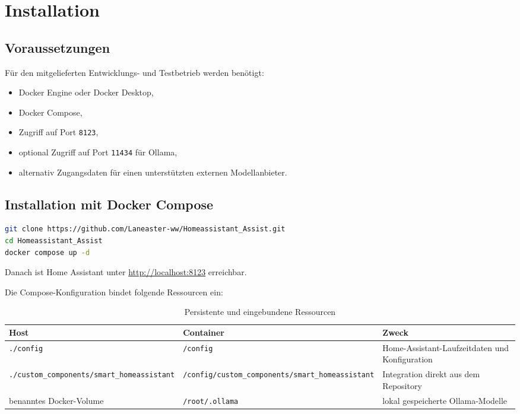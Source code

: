 \documentclass[
  11pt,
  a4paper,
  oneside,
  parskip=half
]{scrreprt}
\newcommand{\code}[1]{\texttt{#1}}
\begin{document}
\chapter{Installation}

\section{Voraussetzungen}

Für den mitgelieferten Entwicklungs- und Testbetrieb werden benötigt:

\begin{itemize}
  \item Docker Engine oder Docker Desktop,
  \item Docker Compose,
  \item Zugriff auf Port \code{8123},
  \item optional Zugriff auf Port \code{11434} für Ollama,
  \item alternativ Zugangsdaten für einen unterstützten externen Modellanbieter.
\end{itemize}

\section{Installation mit Docker Compose}

\begin{lstlisting}[language=bash,caption={Repository klonen und Dienste starten}]
git clone https://github.com/Laneaster-ww/Homeassistant_Assist.git
cd Homeassistant_Assist
docker compose up -d
\end{lstlisting}

Danach ist Home Assistant unter
\href{http://localhost:8123}{http://localhost:8123} erreichbar.

Die Compose-Konfiguration bindet folgende Ressourcen ein:

\begin{table}[htbp]
  \centering
  \begin{tabularx}{\textwidth}{@{}L{49mm}L{57mm}Y@{}}
    \toprule
    \textbf{Host} & \textbf{Container} & \textbf{Zweck} \\
    \midrule
    \code{./config} & \code{/config} & Home-Assistant-Laufzeitdaten und Konfiguration \\
    \code{./custom\_components/smart\_homeassistant} &
    \code{/config/custom\_components/smart\_homeassistant} &
    Integration direkt aus dem Repository \\
    benanntes Docker-Volume & \code{/root/.ollama} & lokal gespeicherte Ollama-Modelle \\
    \bottomrule
  \end{tabularx}
  \caption{Persistente und eingebundene Ressourcen}
\end{table}
\end{document}
